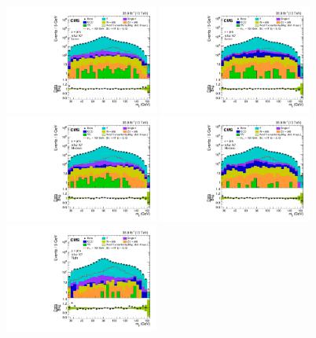 \begin{figure}
\centering
{\includegraphics[width=0.45\textwidth]{Image/PostFit/mjj_postfit_ch1.pdf}}
{\includegraphics[width=0.45\textwidth]{Image/PostFit/mjj_postfit_ch4.pdf}}
{\includegraphics[width=0.45\textwidth]{Image/PostFit/mjj_postfit_ch2.pdf}}
{\includegraphics[width=0.45\textwidth]{Image/PostFit/mjj_postfit_ch5.pdf}}
{\includegraphics[width=0.45\textwidth]{Image/PostFit/mjj_postfit_ch3.pdf}}

\end{figure}
